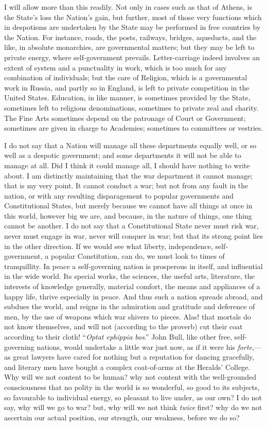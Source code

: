 I will allow more than this readily. Not only in
cases such as that of Athens, is the State's loss the Nation's gain,
but further, most of those very functions which in despotisms are
undertaken by the State may be performed in free countries by the
Nation. For instance, roads, the posts, railways, bridges, aqueducts,
and the like, in absolute monarchies, are governmental matters; but
they may be left to private energy, where self-government prevails.
Letter-carriage indeed involves an extent of system and a punctuality
in work, which is too much for any combination of individuals; but the
care of Religion, which is a governmental work in Russia, and partly
so in England, is left to private competition in the United
States. Education, in like manner, is sometimes provided by the State,
sometimes left to religious denominations, sometimes to private zeal
and charity. The Fine Arts sometimes depend on the patronage of Court
or Government; sometimes are given in charge to Academies; sometimes
to committees or vestries.

I do not say that a Nation will manage all these
departments equally well, or so well as a despotic government; and
some departments it will not be able to manage at all. Did I think it
could manage all, I should have nothing to write about. I am
distinctly maintaining that the war department it cannot manage; that
is my very point. It cannot conduct a war; but not from any fault in
the nation, or with any resulting disparagement to popular governments
and Constitutional States, but merely because we cannot have all
things at once in this world, however big we are, and because, in the
nature of things, one thing cannot be another. I do not say that a
Constitutional State never must risk war, never must engage in war,
never will conquer in war; but that its strong point lies in the other
direction. If we would see what liberty, independence,
self-government, a popular Constitution, can do, we must look to times
of tranquillity. In peace a self-governing nation is prosperous in
itself, and influential in the wide world. Its special works, the
sciences, the useful arts, literature, the interests of knowledge
generally, material comfort, the means and appliances of a happy life,
thrive especially in peace. And thus such a nation spreads abroad, and
subdues the world, and reigns in the admiration and gratitude and
deference of men, by the use of weapons which war shivers to pieces.
Alas! that mortals do not know themselves, and will not (according
to the proverb) cut their coat according to their cloth! ``\emph{Optat
ephippia bos}.'' John Bull, like other free, self-governing nations,
would undertake a little war just now, as if it were his \emph{forte},—as
great lawyers have cared for nothing but a reputation for dancing
gracefully, and literary men have bought a complex coat-of-arms at the
Heralds' College. Why will we not content to be human? why not content
with the well-grounded consciousness that no polity in the world is so
wonderful, so good to its subjects, so favourable to individual
energy, so pleasant to live under, as our own? I do not say, why will
we go to war? but, why will we not think \emph{twice} first? why do we not
ascertain our actual position, our strength, our weakness, before we
do so?

